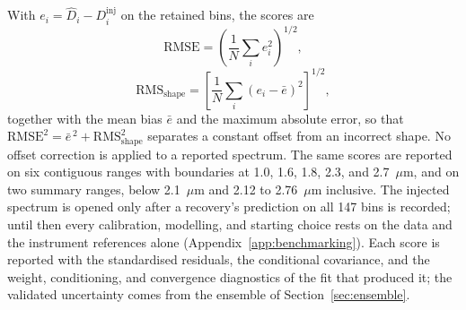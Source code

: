 With $e_i=\widehat D_i-D_i^{\mathrm{inj}}$ on the retained bins, the
scores are
\begin{equation}
 \mathrm{RMSE}=
 \left(\frac{1}{N}\sum_i e_i^2\right)^{1/2},
 \label{eq:absolute-rmse}
\end{equation}
\begin{equation}
 \mathrm{RMS}_{\mathrm{shape}}=
 \left[\frac{1}{N}\sum_i(e_i-\bar e)^2\right]^{1/2},
 \label{eq:morphology-rmse}
\end{equation}
together with the mean bias $\bar e$ and the maximum absolute error, so
that $\mathrm{RMSE}^2=\bar e^{\,2}+\mathrm{RMS}_{\mathrm{shape}}^2$
separates a constant offset from an incorrect shape. No offset
correction is applied to a reported spectrum. The same scores are
reported on six contiguous ranges with boundaries at 1.0, 1.6, 1.8, 2.3,
and 2.7~$\mu\mathrm{m}$, and on two summary ranges, below
2.1~$\mu\mathrm{m}$ and 2.12 to 2.76~$\mu\mathrm{m}$ inclusive. The injected
spectrum is opened only after a recovery's prediction on all 147 bins is
recorded; until then every calibration, modelling, and starting choice
rests on the data and the instrument references alone
(Appendix~\ref{app:benchmarking}). Each score is reported with the
standardised residuals, the conditional covariance, and the weight,
conditioning, and convergence diagnostics of the fit that produced it;
the validated uncertainty comes from the ensemble of
Section~\ref{sec:ensemble}.
